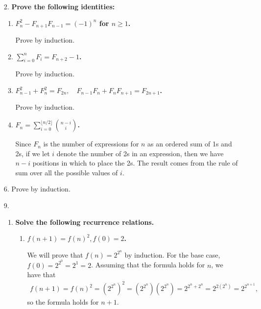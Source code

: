 \documentclass[a4paper,12pt]{article}
\begin{document}
\begin{enumerate}
    \item[2.]
        \boldmath
        \textbf{Prove the following identities:} \par
        \unboldmath
        \begin{enumerate}
            \item
                \boldmath
                \textbf{$F_n^2 - F_{n + 1} F_{n - 1} = (-1)^n$ for $n \geq 1$.} \par
                \unboldmath
                Prove by induction.

            \item
                \boldmath
                \textbf{$\sum_{i = 0}^n F_i = F_{n + 2} - 1$.} \par
                \unboldmath
                Prove by induction.

            \item
                \boldmath
                \textbf{$F_{n - 1}^2 + F_n^2 = F_{2n}, \quad F_{n - 1} F_n + F_n F_{n + 1} = F_{2n + 1}$.} \par
                \unboldmath
                Prove by induction.

            \item
                \boldmath
                \textbf{$F_n = \sum_{i = 0}^{\lfloor n/2 \rfloor} \binom{n - i}{i}$.} \par
                \unboldmath
                Since $F_n$ is the number of expressions for $n$ as an ordered sum of 1s and 2s, if we let $i$ denote the number of 2s in an expression, then we have $n - i$ positions in which to place the 2s. The result comes from the rule of sum over all the possible values of $i$.
        \end{enumerate}

    \item[6.]
        Prove by induction.

    \item[9.]
        \begin{enumerate}
            \item
                \boldmath
                \textbf{Solve the following recurrence relations.} \par
                \unboldmath
                \begin{enumerate}
                    \item
                        \boldmath
                        \textbf{$f(n + 1) = f(n)^2, f(0) = 2$.} \par
                        \unboldmath
                        We will prove that $f(n) = 2^{2^n}$ by induction. For the base case, $f(0) = 2^{2^0} = 2^1 = 2$. Assuming that the formula holds for $n$, we have that
                        \begin{align*}
                            f(n + 1) = f(n)^2 = \left( 2^{2^n} \right)^2 = \left( 2^{2^n} \right) \left( 2^{2^n} \right) = 2^{2^n + 2^n} = 2^{2 \left( 2^n \right)} = 2^{2^{n + 1}},
                        \end{align*}
                        so the formula holds for $n + 1$.


\end{enumerate}
\end{enumerate}
\end{enumerate}
\end{document}
